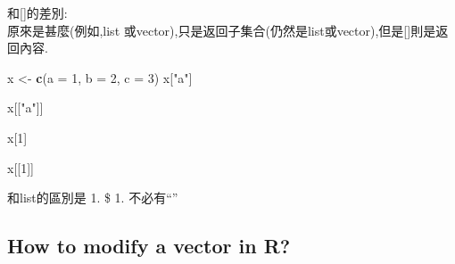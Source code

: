 \documentclass[]{book}
\newenvironment{Shaded}{\begin{snugshade}}{\end{snugshade}}
\newcommand{\KeywordTok}[1]{\textcolor[rgb]{0.13,0.29,0.53}{\textbf{#1}}}
\newcommand{\DataTypeTok}[1]{\textcolor[rgb]{0.13,0.29,0.53}{#1}}
\newcommand{\DecValTok}[1]{\textcolor[rgb]{0.00,0.00,0.81}{#1}}
\newcommand{\StringTok}[1]{\textcolor[rgb]{0.31,0.60,0.02}{#1}}
\newcommand{\OperatorTok}[1]{\textcolor[rgb]{0.81,0.36,0.00}{\textbf{#1}}}
\newcommand{\NormalTok}[1]{#1}
\theoremstyle{definition}
\theoremstyle{definition}
\theoremstyle{definition}
\theoremstyle{remark}
\begin{document}
\protect\hyperlink{section-1}{}
和{[}\protect\hyperlink{section-1}{}{]}的差別:\\
原來是甚麼(例如,list
或vector),\protect\hyperlink{section-1}{}只是返回子集合(仍然是list或vector),但是{[}\protect\hyperlink{section-1}{}{]}則是返回內容.

\begin{Shaded}
\begin{Highlighting}[]
\NormalTok{x <-}\StringTok{ }\KeywordTok{c}\NormalTok{(}\DataTypeTok{a =} \DecValTok{1}\NormalTok{, }\DataTypeTok{b =} \DecValTok{2}\NormalTok{, }\DataTypeTok{c =} \DecValTok{3}\NormalTok{)}
\NormalTok{x[}\StringTok{"a"}\NormalTok{]}
\end{Highlighting}
\end{Shaded}

\begin{Shaded}
\begin{Highlighting}[]
\NormalTok{x[[}\StringTok{"a"}\NormalTok{]]}
\end{Highlighting}
\end{Shaded}

\begin{Shaded}
\begin{Highlighting}[]
\NormalTok{x[}\DecValTok{1}\NormalTok{]}
\end{Highlighting}
\end{Shaded}

\begin{Shaded}
\begin{Highlighting}[]
\NormalTok{x[[}\DecValTok{1}\NormalTok{]]}
\end{Highlighting}
\end{Shaded}

和list的區別是 1. \$ 1. 不必有``''

\begin{Shaded}
\end{Shaded}

\subsection{How to modify a vector in
R?}\label{how-to-modify-a-vector-in-r}
\end{document}
